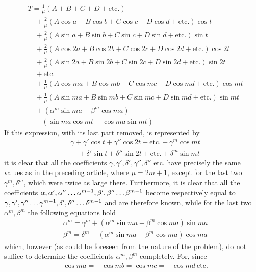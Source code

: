 \[
\begin{aligned}
&T=\frac1\mu(A+B+C+D+\mathrm{etc.})\\[5pt]
&\quad+\frac2\mu(A\cos a+B\cos b+C\cos c+D\cos d+\mathrm{etc.})\cos t\\[5pt]
&\quad+\frac2\mu(A\sin a+B\sin b+C\sin c+D\sin d+\mathrm{etc.})\sin t\\[5pt]
&\quad+\frac2\mu(A\cos2a+B\cos2b+C\cos2c+D\cos2d+\mathrm{etc.})\cos2t\\[5pt]
&\quad+\frac2\mu(A\sin2a+B\sin2b+C\sin2c+D\sin2d+\mathrm{etc.})\sin2t\\[5pt]
&\quad+\mathrm{etc.}\\[5pt]
&\quad+\frac1\mu(A\cos ma+B\cos mb+C\cos mc+D\cos md+\mathrm{etc.})\cos mt\\[5pt]
&\quad+\frac1\mu(A\sin ma+B\sin mb+C\sin mc+D\sin md+\mathrm{etc.})\sin mt\\[5pt]
&\quad+(\alpha^m\sin ma-\beta^m\cos ma)\\[5pt]&\qquad(\sin ma\cos mt-\cos ma\sin mt)
\end{aligned}
\]
If this expression, with its last part removed, is represented by
\[
\begin{aligned}
&\gamma+\gamma'\cos t+\gamma''\cos2t+\mathrm{etc.}+\gamma^m\cos mt\\[5pt]
&\quad+\delta'\sin t+\delta''\sin2t+\mathrm{etc.}+\delta^m\sin mt
\end{aligned}
\]
it is clear that all the coefficients $\gamma,\gamma',\delta',\gamma'',\delta''$ etc. have precisely the same values as in the preceding article, where $\mu=2m+1$, except for the last two $\gamma^m,\delta^m$, which were twice as large there. Furthermore, it is clear that all the coefficients
$\alpha,\alpha',\alpha''\mathinner{.\,.\,.}\alpha^{m-1},\beta',\beta''\mathinner{.\,.\,.}\beta^{m-1}$ become respectively equal to $\gamma,\gamma',\gamma''\mathinner{.\,.\,.}\gamma^{m-1},\delta',\delta''\mathinner{.\,.\,.}\delta^{m-1}$ and are therefore known, while for the last two $\alpha^m,\beta^m$ the following equations hold
\[
\begin{aligned}
&\alpha^m=\gamma^m+(\alpha^m\sin ma-\beta^m\cos ma)\sin ma\\[5pt]
&\beta^m=\delta^m-(\alpha^m\sin ma-\beta^m\cos ma)\cos ma
\end{aligned}
\]
which, however (as could be foreseen from the nature of the problem), do not suffice to determine the coefficients $\alpha^m,\beta^m$ completely. For, since
\[
\begin{aligned}
&\cos ma=-\cos mb=\cos mc=-\cos md\ \mathrm{etc.}
\end{aligned}
\]
